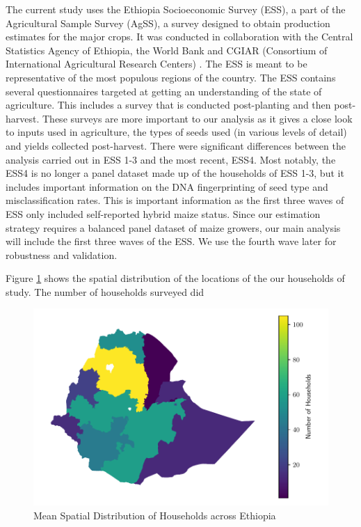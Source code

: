 \documentclass{article}
\begin{document}
The current study uses the Ethiopia Socioeconomic Survey (ESS), a part of the Agricultural Sample Survey (AgSS), a survey 
designed to obtain production estimates for the major crops. It was conducted in collaboration with the Central Statistics Agency of Ethiopia, the World Bank and CGIAR (Consortium of International Agricultural Research Centers) \citep{kosmowski2020shining}. The ESS is meant to be representative of the most populous regions of the country. The ESS contains several questionnaires targeted at getting an understanding of the state of agriculture. This includes a survey that is conducted post-planting and then post-harvest. These surveys are more important to our analysis as it gives a close look to inputs used in agriculture, the types of seeds used (in various levels of detail) and yields collected post-harvest. There were significant differences between the analysis carried out in ESS 1-3 and the most recent, ESS4. Most notably, the ESS4 is no longer a panel dataset made up of the households of ESS 1-3, but it includes important information on the DNA fingerprinting of seed type and misclassification rates. This is important information as the first three waves of ESS only included self-reported hybrid maize status. Since our estimation strategy requires a balanced panel dataset of maize growers, our main analysis will include the first three waves of the ESS. We use the fourth wave later for robustness and validation.

Figure \ref{map:regions} shows the spatial distribution of the locations of the our households of study. The number of households surveyed did

\begin{figure}
    \centering
    \includegraphics{results/figures/map_hhids.pdf}
    \caption{Mean Spatial Distribution of Households across Ethiopia}
    \label{map:regions}
\end{figure}
\end{document}
